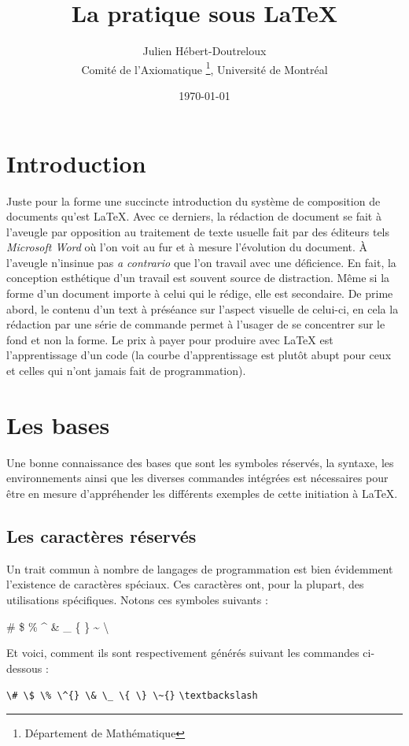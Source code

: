 \documentclass[french, babel,twocolumn]{article}
\title{La pratique sous \LaTeX}
\author{Julien Hébert-Doutreloux\\%
	Comité de l'Axiomatique%
	\thanks{Département de Mathématique}, Université de Montréal}
\date{\today}
\begin{document}
	\onecolumn
	\maketitle
	\tableofcontents
	\section{Introduction}
		Juste pour la forme une succincte introduction du système de composition de documents qu'est \LaTeX. Avec ce derniers, la rédaction de document se fait à l'aveugle par opposition au traitement de texte usuelle fait par des éditeurs tels \textit{Microsoft Word} où l'on voit au fur et à mesure l'évolution du document. À l'aveugle n'insinue pas \textit{a contrario} que l'on travail avec une déficience. En fait, la conception esthétique d'un travail est souvent source de distraction. Même si la forme d'un document importe à celui qui le rédige, elle est secondaire. De prime abord, le contenu d'un text à préséance sur l'aspect visuelle de celui-ci, en cela la rédaction par une série de commande permet à l'usager de se concentrer sur le fond et non la forme. Le prix à payer pour produire avec \LaTeX{} est l'apprentissage d'un code (la courbe d'apprentissage est plutôt abupt pour ceux et celles qui n'ont jamais fait de programmation).
	\twocolumn
	\section{Les bases}
	Une bonne connaissance des bases que sont les symboles réservés, la syntaxe, les environnements ainsi que les diverses commandes intégrées est nécessaires pour être en mesure d'appréhender les différents exemples de cette initiation à \LaTeX.
%	
	\subsection{Les caractères réservés}
	Un trait commun à nombre de langages de programmation est bien évidemment l'existence de caractères spéciaux. Ces caractères ont, pour la plupart, des utilisations spécifiques. Notons ces symboles suivants :
%	
	\begin{center}
		\# \$ \% \^{} \& \_ \{ \} \~{}  \textbackslash
	\end{center}
%
	\par Et voici, comment ils sont respectivement générés suivant les commandes ci-dessous :
	\begin{flushleft}\label{lst:Caratères réservés}
		\verb|\# \$ \% \^{} \& \_ \{ \} \~{}|
		\verb|\textbackslash|
	\end{flushleft}
%	
\end{document}
